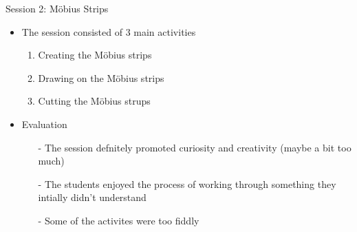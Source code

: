 \documentclass{beamer}  %
\begin{document}
\begin{frame}{Session 2: M\"{o}bius Strips}
    \begin{itemize}
        \item The session consisted of 3 main activities
        \begin{enumerate}
            \item Creating the M\"{o}bius strips
            \item Drawing on the M\"{o}bius strips
            \item Cutting the  M\"{o}bius strups
        \end{enumerate}

        \vspace{10pt}

        \item Evaluation
        \begin{itemize}
            \item[-] The session defnitely promoted curiosity and creativity  (maybe a bit too much)
            \item[-] The students enjoyed the process of working through something they intially didn't understand
            \item[-] Some of the activites were too fiddly 
        \end{itemize}
    \end{itemize}
\end{frame}
\end{document}

